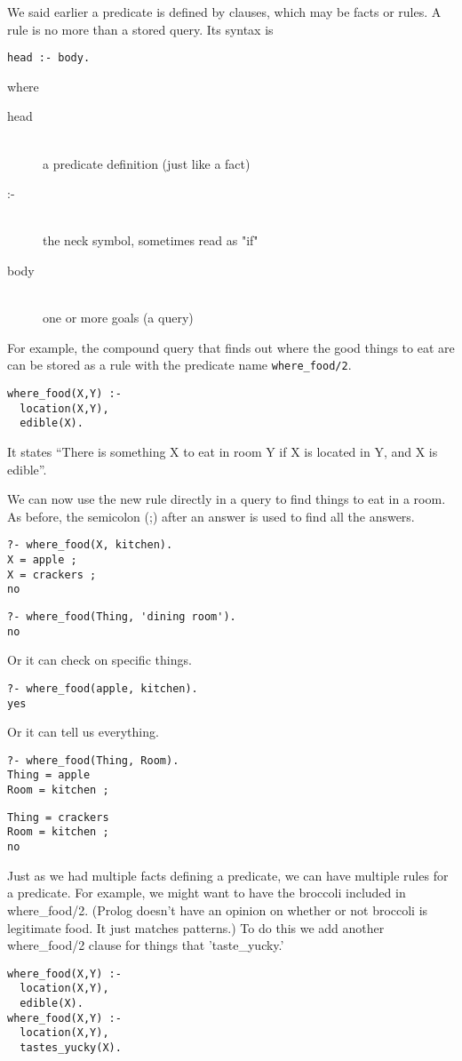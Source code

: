 \label{adv5}\secdown

We said earlier a predicate is defined by clauses, which may be facts or rules. A rule is no more than a stored query. Its syntax is
\begin{verbatim}
head :- body.
\end{verbatim}
where
\begin{description}
\item[head]\ \\
a predicate definition (just like a fact)
\item[:-]\ \\
the neck symbol, sometimes read as "if"
\item[body]\ \\
one or more goals (a query)
\end{description}

For example, the compound query that finds out where the good things to eat are
can be stored as a rule with the predicate name \verb'where_food/2'.
\begin{verbatim}
where_food(X,Y) :-  
  location(X,Y),
  edible(X).
\end{verbatim}
It states ``There is something X to eat in room Y if X is located in Y, and X
is edible''.

We can now use the new rule directly in a query to find things to eat in a room.
As before, the semicolon (;) after an answer is used to find all the answers.
\begin{verbatim}
?- where_food(X, kitchen).
X = apple ;
X = crackers ;
no
\end{verbatim}
\begin{verbatim}
?- where_food(Thing, 'dining room').
no
\end{verbatim}
Or it can check on specific things.
\begin{verbatim}
?- where_food(apple, kitchen).
yes
\end{verbatim}
Or it can tell us everything.
\begin{verbatim}
?- where_food(Thing, Room).
Thing = apple
Room = kitchen ;
\end{verbatim}
\begin{verbatim}
Thing = crackers
Room = kitchen ;
no
\end{verbatim}

Just as we had multiple facts defining a predicate, we can have multiple rules
for a predicate. For example, we might want to have the broccoli included in
where_food/2. (Prolog doesn't have an opinion on whether or not broccoli is
legitimate food. It just matches patterns.) To do this we add another
where_food/2 clause for things that 'taste_yucky.'
\begin{verbatim}
where_food(X,Y) :-
  location(X,Y),
  edible(X).
where_food(X,Y) :-
  location(X,Y),
  tastes_yucky(X).
\end{verbatim}
  
\secup
